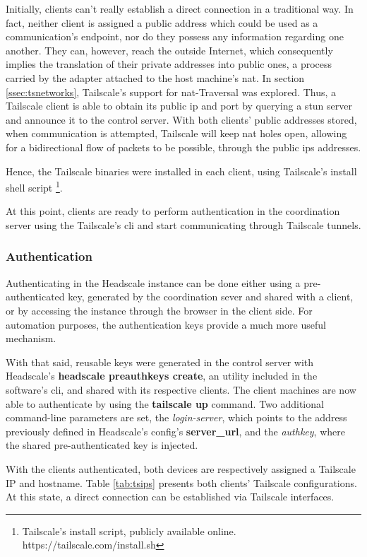 \documentclass[11pt,twoside,a4paper]{report}
\begin{document}
Initially, clients can't really establish a direct connection in a traditional way. In fact, neither client is assigned a public address which could be used as a communication's endpoint, nor do they possess any information regarding one another. They can, however, reach the outside Internet, which consequently implies the translation of their private addresses into public ones, a process carried by the adapter attached to the host machine's \ac{nat}. In section \ref{ssec:tsnetworks}, Tailscale's support for \ac{nat}-Traversal was explored. Thus, a Tailscale client is able to obtain its public \ac{ip} and port by querying a \ac{stun} server and announce it to the control server. With both clients' public addresses stored, when communication is attempted, Tailscale will keep \ac{nat} holes open, allowing for a bidirectional flow of packets to be possible, through the public \acp{ip} addresses.

Hence, the Tailscale binaries were installed in each client, using Tailscale's install shell script \footnote{Tailscale's install script, publicly available online. https://tailscale.com/install.sh}.

At this point, clients are ready to perform authentication in the coordination server using the Tailscale's \ac{cli} and start communicating through Tailscale tunnels.

\subsubsection{Authentication}

Authenticating in the Headscale instance can be done either using a pre-authenticated key, generated by the coordination sever and shared with a client, or by accessing the instance through the browser in the client side. For automation purposes, the authentication keys provide a much more useful mechanism.

With that said, reusable keys were generated in the control server with Headscale's \textbf{headscale preauthkeys create}, an utility included in the software's \ac{cli}, and shared with its respective clients. The client machines are now able to authenticate by using the \textbf{tailscale up} command. Two additional command-line parameters are set, the \emph{login-server}, which points to the address previously defined in Headscale's config's \textbf{server\_url}, and the \emph{authkey}, where the shared pre-authenticated key is injected.

With the clients authenticated, both devices are respectively assigned a Tailscale IP and hostname. Table \ref{tab:tsips} presents both clients' Tailscale configurations. At this state, a direct connection can be established via Tailscale interfaces.
\end{document}

